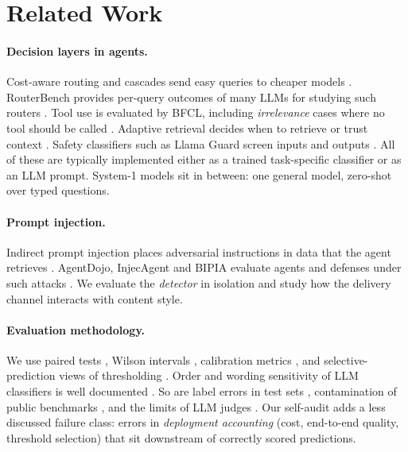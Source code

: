 \section{Related Work}
\paragraph{Decision layers in agents.}
Cost-aware routing and cascades send easy queries to cheaper models \citep{chen2023frugalgpt,ong2024routellm}. RouterBench provides per-query outcomes of many LLMs for studying such routers \citep{hu2024routerbench}. Tool use is evaluated by BFCL, including \emph{irrelevance} cases where no tool should be called \citep{patil2023gorilla,patil2025bfcl}. Adaptive retrieval decides when to retrieve or trust context \citep{asai2024selfrag,yan2024crag,jeong2024adaptiverag}. Safety classifiers such as Llama Guard screen inputs and outputs \citep{inan2023llamaguard}. All of these are typically implemented either as a trained task-specific classifier or as an LLM prompt. System-1 models sit in between: one general model, zero-shot over typed questions.

\paragraph{Prompt injection.}
Indirect prompt injection places adversarial instructions in data that the agent retrieves \citep{greshake2023indirect}. AgentDojo, InjecAgent and BIPIA evaluate agents and defenses under such attacks \citep{debenedetti2024agentdojo,zhan2024injecagent,yi2023bipia}. We evaluate the \emph{detector} in isolation and study how the delivery channel interacts with content style.

\paragraph{Evaluation methodology.}
We use paired tests \citep{mcnemar1947note,dror2018hitchhiker}, Wilson intervals \citep{wilson1927probable}, calibration metrics \citep{guo2017calibration,platt1999probabilistic}, and selective-prediction views of thresholding \citep{geifman2017selective}. Order and wording sensitivity of LLM classifiers is well documented \citep{zheng2024mcq,pezeshkpour2024order,sclar2024quantifying}. So are label errors in test sets \citep{northcutt2021pervasive}, contamination of public benchmarks \citep{sainz2023contamination}, and the limits of LLM judges \citep{zheng2023judging}. Our self-audit adds a less discussed failure class: errors in \emph{deployment accounting} (cost, end-to-end quality, threshold selection) that sit downstream of correctly scored predictions.


